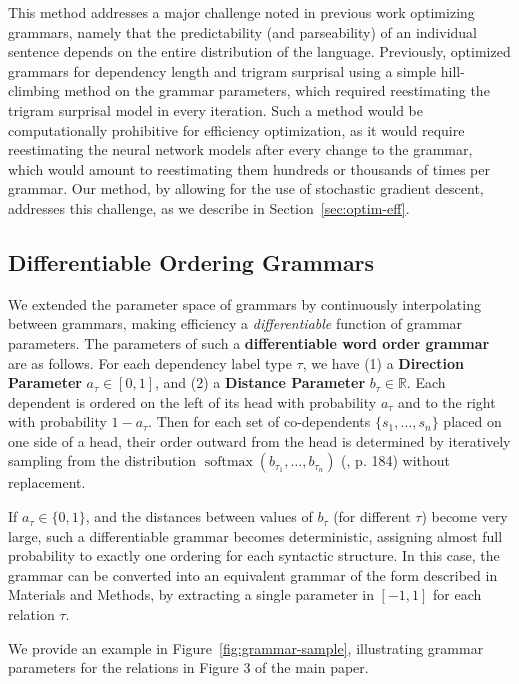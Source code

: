 \documentclass[10pt,twoside,lineno]{article}
\newcommand{\key}[1]{\textbf{#1}}
\begin{document}
This method addresses a major challenge noted in previous work optimizing grammars, namely that the predictability (and parseability) of an individual sentence depends on the entire distribution of the language.
Previously, \citet{gildea2015human} optimized grammars for dependency length and trigram surprisal using a simple hill-climbing method on the grammar parameters, which required reestimating the trigram surprisal model in every iteration.
Such a method would be computationally prohibitive for efficiency optimization, as it would require reestimating the neural network models after every change to the grammar, which would amount to reestimating them hundreds or thousands of times per grammar.
Our method, by allowing for the use of stochastic gradient descent, addresses this challenge, as we describe in Section~\ref{sec:optim-eff}.


\subsection{Differentiable Ordering Grammars}\label{sec:diff-gramm}

We extended the parameter space of grammars by continuously interpolating between grammars, making efficiency a \emph{differentiable} function of grammar parameters.
The parameters of such a \key{differentiable word order grammar} are as follows. 
For each dependency label type $\tau$, we have (1) a \key{Direction Parameter} $a_\tau \in [0,1]$, and (2) a \key{Distance Parameter} $b_\tau \in \mathbb{R}$. 
Each dependent is ordered on the left of its head with probability $a_\tau$ and to the right with probability $1-a_\tau$. 
Then for each set of co-dependents $\{s_1, \dots , s_n\}$ placed on one side of a head, their order outward from the head is determined by iteratively sampling from the distribution $\operatorname{softmax}(b_{\tau_1}, \dots, b_{\tau_n})$ (\cite{goodfellow2016deep}, p. 184) without replacement. 

If $a_\tau \in \{0, 1\}$, and the distances between values of $b_\tau$ (for different $\tau$) become very large, such a differentiable grammar becomes deterministic, assigning almost full probability to exactly one ordering for each syntactic structure.
In this case, the grammar can be converted into an equivalent grammar of the form described in Materials and Methods, by extracting a single parameter in $[-1, 1]$ for each relation $\tau$.

We provide an example in Figure~\ref{fig:grammar-sample}, illustrating grammar parameters for the relations in Figure 3 of the main paper.
\end{document}
